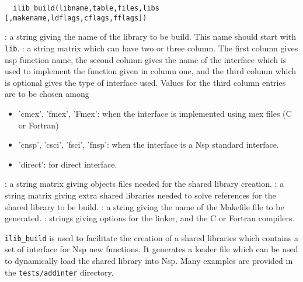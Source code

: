 
\begin{mandesc}
\end{mandesc}
\begin{calling_sequence}
\begin{verbatim}
  ilib_build(libname,table,files,libs [,makename,ldflags,cflags,fflags])  
\end{verbatim}
\end{calling_sequence}
\begin{parameters}
  \begin{varlist}
    : a string giving the name of the library to be build. This name 
    should start with \verb!lib!.
    : a string matrix which can have two or three column. 
    The first column gives nsp function name, the second column gives the name of 
    the interface which is used to implement the function given in column one, and the 
    third column which is optional gives the type of interface used.  
    Values for the third column entries are to be chosen among 
    \begin{itemize}
      \item 'cmex', 'fmex', 'Fmex': when the interface is implemented 
        using mex files (C or Fortran)
      \item 'cnsp', 'csci', 'fsci', 'fnsp': when the interface is a Nsp standard interface.
      \item 'direct': for direct interface. 
    \end{itemize}
    : a string matrix giving objects files needed for the shared library creation.
    :  a string matrix giving extra shared libraries needed to solve references 
    for the shared library to be build.
    : a string giving the name of the Makefile file to be generated.
    : strings giving options for the linker, and the C or 
    Fortran compilers.
  \end{varlist}
\end{parameters}
\begin{mandescription}
  \verb!ilib_build! is used to facilitate the creation of a shared libraries 
  which contains a set of interface for Nsp new functions. It generates 
  a loader file which can be used to dynamically load the shared library 
  into Nsp. Many examples are provided in the \verb!tests/addinter! 
  directory.
\end{mandescription}

